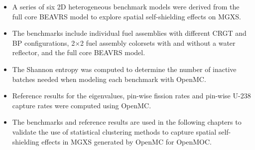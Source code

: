 
\clearpage

\vfill
\begin{highlightsbox}[frametitle=Highlights]
\begin{itemize}
  \item A series of six 2D heterogeneous benchmark models were derived from the full core \ac{BEAVRS} model to explore spatial self-shielding effects on \ac{MGXS}.
  \item The benchmarks include individual fuel assemblies with different \ac{CRGT} and \ac{BP} configurations, 2$\times$2 fuel assembly colorsets with and without a water reflector, and the full core \ac{BEAVRS} model.
  \item The Shannon entropy was computed to determine the number of inactive batches needed when modeling each benchmark with OpenMC.
  \item Reference results for the eigenvalues, pin-wise fission rates and pin-wise U-238 capture rates were computed using OpenMC.
  \item The benchmarks and reference results are used in the following chapters to validate the use of statistical clustering methods to capture spatial self-shielding effects in \ac{MGXS} generated by OpenMC for OpenMOC.
\end{itemize}
\end{highlightsbox}
\vfill